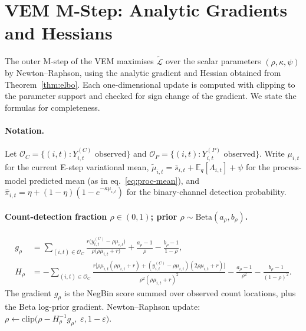 \documentclass[review,12pt]{elsarticle}
\theoremstyle{definition}
\begin{document}
\appendix

\section{VEM M-Step: Analytic Gradients and Hessians}
\label{sec:mstep-formulas}

The outer M-step of the VEM maximises $\tilde{\mathcal{L}}$ over the scalar
parameters $(\rho,\kappa,\psi)$ by Newton--Raphson, using the analytic
gradient and Hessian obtained from Theorem~\ref{thm:elbo}.  Each one-dimensional
update is computed with clipping to the parameter support and checked for
sign change of the gradient.  We state the formulas for completeness.

\paragraph{Notation.}
Let $\mathcal{O}_C = \{(i,t): Y^{(C)}_{i,t}\text{ observed}\}$ and
$\mathcal{O}_P = \{(i,t): Y^{(P)}_{i,t}\text{ observed}\}$.
Write $\mu_{i,t}$ for the current E-step variational mean,
$\tilde\mu_{i,t} = \bar s_{i,t} + \mathbb{E}_q[\Lambda_{i,t}] + \psi$ for the
process-model predicted mean (as in eq.~\ref{eq:proc-mean}),
and $\hat\pi_{i,t} = \eta + (1-\eta)(1-e^{-\kappa\mu_{i,t}})$ for the
binary-channel detection probability.

\paragraph{Count-detection fraction $\rho\in(0,1)$; prior $\rho\sim\mathrm{Beta}(a_\rho,b_\rho)$.}
\begin{align}
g_\rho &= \sum_{(i,t)\in\mathcal{O}_C}
  \frac{r\bigl(y^{(C)}_{i,t}-\rho\mu_{i,t}\bigr)}{\rho\bigl(\rho\mu_{i,t}+r\bigr)}
  + \frac{a_\rho-1}{\rho} - \frac{b_\rho-1}{1-\rho}, \label{eq:grad-rho}\\
H_\rho &= -\sum_{(i,t)\in\mathcal{O}_C}
  \frac{r\bigl[\rho\mu_{i,t}(\rho\mu_{i,t}+r)
    + (y^{(C)}_{i,t}-\rho\mu_{i,t})(2\rho\mu_{i,t}+r)\bigr]}
       {\rho^2(\rho\mu_{i,t}+r)^2}
  - \frac{a_\rho-1}{\rho^2} - \frac{b_\rho-1}{(1-\rho)^2}. \label{eq:hess-rho}
\end{align}
The gradient $g_\rho$ is the NegBin score summed over observed count locations,
plus the Beta log-prior gradient.
Newton--Raphson update: $\rho\leftarrow\mathrm{clip}\bigl(\rho - H_\rho^{-1}g_\rho,\;\varepsilon,1-\varepsilon\bigr)$.
\end{document}
